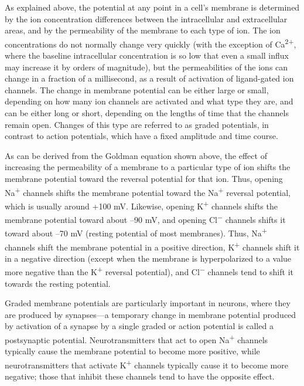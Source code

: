 As explained above, the potential at any point in a cell's membrane is determined by the ion concentration differences between the intracellular and extracellular areas, and by the permeability of the membrane to each type of ion. The ion concentrations do not normally change very quickly (with the exception of Ca\textsuperscript{2+}, where the baseline intracellular concentration is so low that even a small influx may increase it by orders of magnitude), but the permeabilities of the ions can change in a fraction of a millisecond, as a result of activation of ligand-gated ion channels. The change in membrane potential can be either large or small, depending on how many ion channels are activated and what type they are, and can be either long or short, depending on the lengths of time that the channels remain open. Changes of this type are referred to as graded potentials, in contrast to action potentials, which have a fixed amplitude and time course.

As can be derived from the Goldman equation shown above, the effect of increasing the permeability of a membrane to a particular type of ion shifts the membrane potential toward the reversal potential for that ion. Thus, opening Na\textsuperscript{+} channels shifts the membrane potential toward the Na\textsuperscript{+} reversal potential, which is usually around +100 mV. Likewise, opening K\textsuperscript{+} channels shifts the membrane potential toward about --90 mV, and opening Cl\textsuperscript{−} channels shifts it toward about --70 mV (resting potential of most membranes). Thus, Na\textsuperscript{+} channels shift the membrane potential in a positive direction, K\textsuperscript{+} channels shift it in a negative direction (except when the membrane is hyperpolarized to a value more negative than the K\textsuperscript{+} reversal potential), and Cl\textsuperscript{−} channels tend to shift it towards the resting potential.

Graded membrane potentials are particularly important in neurons, where they are produced by synapses---a temporary change in membrane potential produced by activation of a synapse by a single graded or action potential is called a postsynaptic potential. Neurotransmitters that act to open Na\textsuperscript{+} channels typically cause the membrane potential to become more positive, while neurotransmitters that activate K\textsuperscript{+} channels typically cause it to become more negative; those that inhibit these channels tend to have the opposite effect.

